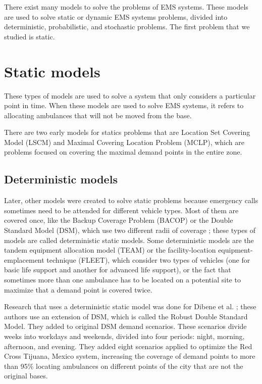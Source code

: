 There exist many models to solve the problems of EMS systems. These models are used to solve static or dynamic EMS systems problems, divided into deterministic, probabilistic, and stochastic problems. The first problem that we studied is static. 

\section{Static models}

These types of models are used to solve a system that only considers a particular point in time. When these models are used to solve EMS systems, it refers to allocating ambulances that will not be moved from the base. 

There are two early models for statics problems that are Location Set Covering Model (LSCM) and Maximal Covering Location Problem (MCLP), which are pro\-blems focused on covering the maximal demand points in the entire zone.


\subsection{Deterministic models}

Later, other models were created to solve static problems because emergency calls sometimes need to be attended for different vehicle types. Most of them are covered once, like the Backup Coverage Problem (BACOP) or the Double Standard Model (DSM), which use two different radii of coverage \cite{li2011covering}; these types of models are called deterministic static models. Some deterministic models are the tandem equipment allocation model (TEAM) or the facility-location equipment-emplacement technique (FLEET), which consider two types of vehicles (one for basic life support and another for advanced life support), or the fact that sometimes more than one ambulance has to be located on a potential site to maximize that a demand point is covered twice. 


Research that uses a deterministic static model was done for Dibene et al. \cite{dibene2017optimizing}; these authors use an extension of DSM, which is called the Robust Double Standard Model. They added to original DSM demand scenarios. These scenarios divide weeks into workdays and weekends, divided into four periods: night, morning, afternoon, and evening. They added eight scenarios applied to optimize the Red Cross Tijuana, Mexico system, increasing the coverage of demand points to more than 95\% locating ambulances on different points of the city that are not the original bases.  

